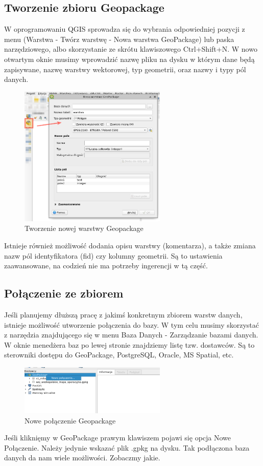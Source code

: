 \documentclass[a4paper,11pt, onecolumn, openany]{memoir}
\begin{document}
			\subsection{Tworzenie zbioru Geopackage}
			W oprogramowaniu QGIS sprowadza się do wybrania odpowiedniej pozycji z menu (Warstwa - Twórz warstwę - Nowa warstwa GeoPackage) lub paska narzędziowego, albo skorzystanie ze skrótu klawiszowego Ctrl+Shift+N. W nowo otwartym oknie musimy wprowadzić nazwę pliku na dysku w którym dane będą zapisywane, nazwę warstwy wektorowej, typ geometrii, oraz nazwy i typy pól danych. 
			\begin{figure}[!ht]
				\centering
				\includegraphics[width=7cm]{geopackage-tworz}
				\caption{Tworzenie nowej warstwy Geopackage}
			\end{figure}			
		    Istnieje również możliwość dodania opisu warstwy (komentarza), a także zmiana nazw pól identyfikatora (fid) czy kolumny geometrii. Są to ustawienia zaawansowane, na codzień nie ma potrzeby ingerencji w tą część.
			\subsection{Połączenie ze zbiorem}
			Jeśli planujemy dłuższą pracę z jakimś konkretnym zbiorem warstw danych, istnieje możliwość utworzenie połączenia do bazy. W tym celu musimy skorzystać z narzędzia znajdującego się w menu Baza Danych - Zarządzanie bazami danych. W oknie menedżera baz po lewej stronie znajdziemy listę tzw. dostawców. Są to sterowniki dostępu do GeoPackage, PostgreSQL, Oracle, MS Spatial, etc.
			\begin{figure}[!ht]
				\centering
				\includegraphics[width=7cm]{geopackage-polaczenie}
				\caption{Nowe połączenie Geopackage}
			\end{figure}
			 Jeśli kliknięmy w GeoPackage prawym klawiszem pojawi się opcja Nowe Połączenie. Należy jedynie wskazać plik .gpkg na dysku. Tak podłączona baza danych da nam wiele możliwości. Zobaczmy jakie.
\end{document}
